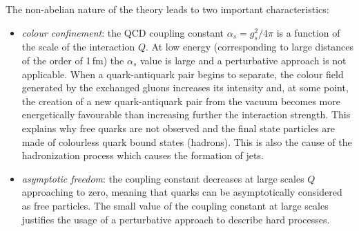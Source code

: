 The non-abelian nature of the theory leads to two important characteristics:
\begin{itemize}
\item \emph{colour confinement}: the QCD coupling constant $\alpha_s = g_s^2/4\pi$ is a function of the scale of the interaction $Q$. At low energy (corresponding to large distances of the order of 1\,fm) the $\alpha_s$ value is large and a perturbative approach is not applicable. When a quark-antiquark pair begins to separate, the colour field generated by the exchanged gluons increases its intensity and, at some point, the creation of a new quark-antiquark pair from the vacuum becomes more energetically favourable than increasing further the interaction strength. This explains why free quarks are not observed and the final state particles are made of colourless quark bound states (hadrons). This is also the cause of the hadronization process which causes the formation of jets.

\item \emph{asymptotic freedom}: the coupling constant decreases at large scales $Q$ approaching to zero, meaning that quarks can be asymptotically considered as free particles. The small value of the coupling constant at large scales justifies the usage of a perturbative approach to describe hard processes.
\end{itemize}

